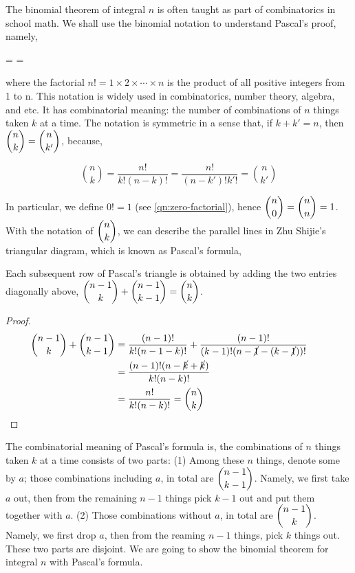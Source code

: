 \documentclass[b5paper]{article}
\begin{document}
The binomial theorem of integral $n$ is often taught as part of combinatorics in school math. We shall use the binomial notation to understand Pascal's proof, namely,

\be
{} =  = 
\ee

where the factorial $n! = 1 \times 2 \times \dotsb \times n$ is the product of all positive integers from 1 to n. This notation is widely used in combinatorics, number theory, algebra, and etc. It has combinatorial meaning: the number of combinations of $n$ things taken $k$ at a time. The notation is symmetric in a sense that, if $k + k' = n$, then $\dbinom{n}{k} = \dbinom{n}{k'}$, because,

\[
\binom{n}{k} = \frac{n!}{k!(n-k)!} = \frac{n!}{(n-k')!k'!} = \binom{n}{k'}
\]

In particular, we define $0! = 1$ (see \cref{qn:zero-factorial}), hence $\dbinom{n}{0} = \dbinom{n}{n} = 1$. With the notation of $\dbinom{n}{k}$, we can describe the parallel lines in Zhu Shijie's triangular diagram, which is known as Pascal's formula,

\begin{proposition}
Each subsequent row of Pascal's triangle is obtained by adding the two entries diagonally above, $\dbinom{n-1}{k} + \dbinom{n-1}{k-1} = \dbinom{n}{k}$.
\end{proposition}

\begin{proof}
  \begin{align*}
    \binom{n-1}{k} + \binom{n-1}{k-1} &= \frac{(n-1)!}{k!(n-1-k)!} + \frac{(n-1)!}{(k-1)!(n-\cancel{1}-(k-\cancel{1}))!} \\
  &= \frac{(n-1)!(n - \cancel{k} + \cancel{k})}{k!(n-k)!} && \\
  &= \frac{n!}{k!(n-k)!} = \binom{n}{k} &&\qedhere
  \end{align*}
\end{proof}

The combinatorial meaning of Pascal's formula is, the combinations of $n$ things taken $k$ at a time consists of two parts: (1) Among these $n$ things, denote some by $a$; those combinations including $a$, in total are $\dbinom{n-1}{k-1}$. Namely, we first take $a$ out, then from the remaining $n-1$ things pick $k-1$ out and put them together with $a$. (2) Those combinations without $a$, in total are $\dbinom{n-1}{k}$. Namely, we first drop $a$, then from the reaming $n-1$ things, pick $k$ things out. These two parts are disjoint. We are going to show the binomial theorem for integral $n$ with Pascal's formula.
\end{document}

